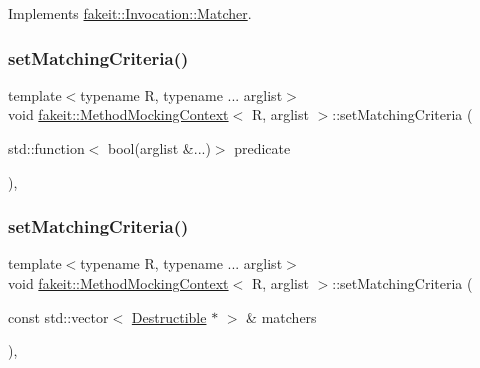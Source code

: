 Implements \mbox{\hyperlink{structfakeit_1_1Invocation_1_1Matcher_a77b45c801fe29889c148516df1ffcb06}{fakeit\+::\+Invocation\+::\+Matcher}}.

\mbox{\label{classfakeit_1_1MethodMockingContext_a43555a14b32453588eb3990a7c6b9a09}} 
\subsubsection{\texorpdfstring{setMatchingCriteria()}{setMatchingCriteria()}\hspace{0.1cm}{\footnotesize\ttfamily [1/27]}}
{\footnotesize\ttfamily template$<$typename R, typename ... arglist$>$ \\
void \mbox{\hyperlink{classfakeit_1_1MethodMockingContext}{fakeit\+::\+Method\+Mocking\+Context}}$<$ R, arglist $>$\+::set\+Matching\+Criteria (\begin{DoxyParamCaption}\item[{std\+::function$<$ bool(arglist \&...)$>$}]{predicate }\end{DoxyParamCaption})\hspace{0.3cm}{\ttfamily [inline]}, {\ttfamily [protected]}}

\mbox{\label{classfakeit_1_1MethodMockingContext_affc5ac50fc419a5f8b5adff8d5d02941}} 
\subsubsection{\texorpdfstring{setMatchingCriteria()}{setMatchingCriteria()}\hspace{0.1cm}{\footnotesize\ttfamily [2/27]}}
{\footnotesize\ttfamily template$<$typename R, typename ... arglist$>$ \\
void \mbox{\hyperlink{classfakeit_1_1MethodMockingContext}{fakeit\+::\+Method\+Mocking\+Context}}$<$ R, arglist $>$\+::set\+Matching\+Criteria (\begin{DoxyParamCaption}\item[{const std\+::vector$<$ \mbox{\hyperlink{classfakeit_1_1Destructible}{Destructible}} $\ast$ $>$ \&}]{matchers }\end{DoxyParamCaption})\hspace{0.3cm}{\ttfamily [inline]}, {\ttfamily [protected]}}

